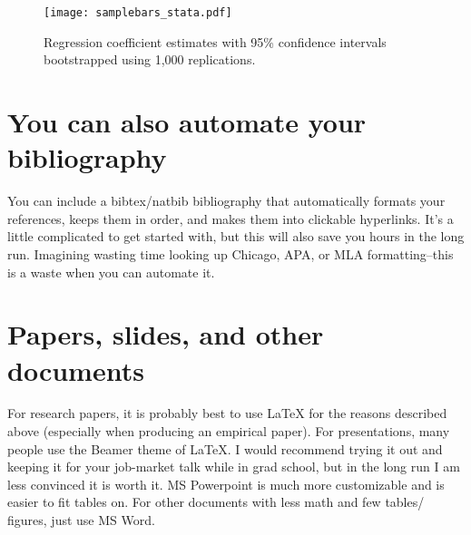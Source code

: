 \documentclass{article}
\begin{document}
\begin{figure}[ht]
    \centering
    \texttt{[image: samplebars\_stata.pdf]}
    \caption{Regression coefficient estimates with 95\% confidence intervals bootstrapped using 1,000 replications.}
    \label{fig:samplebars_stata}
\end{figure}

\section{You can also automate your bibliography}

You can include a bibtex/natbib bibliography that automatically formats your references, keeps them in order, and makes them into clickable hyperlinks. It's a little complicated to get started with, but this will also save you hours in the long run.  Imagining wasting time looking up Chicago, APA, or MLA formatting--this is a waste when you can automate it.

\section{Papers, slides, and other documents}
For research papers, it is probably best to use LaTeX for the reasons described above (especially when producing an empirical paper).  For presentations, many people use the Beamer theme of LaTeX.  I would recommend trying it out and keeping it for your job-market talk while in grad school, but in the long run I am less convinced it is worth it.  MS Powerpoint is much more customizable and is easier to fit tables on.  For other documents with less math and few tables/ figures, just use MS Word.



\end{document}
